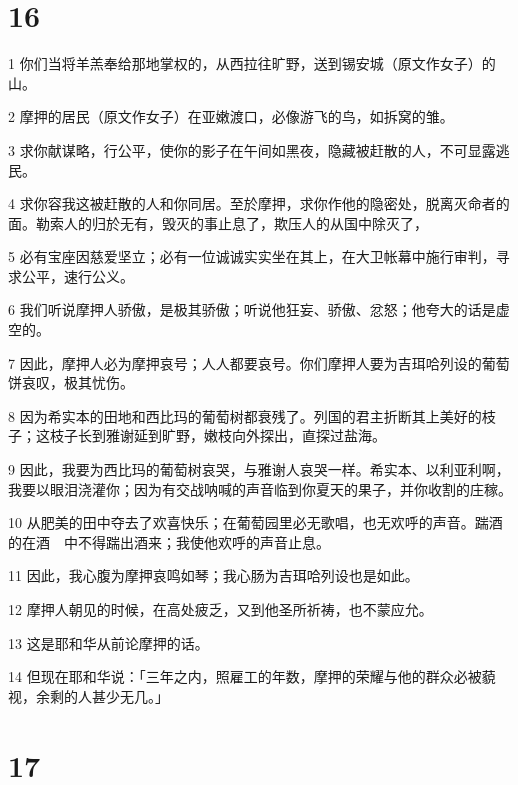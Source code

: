 \chapter{16}

\par 1 你们当将羊羔奉给那地掌权的，从西拉往旷野，送到锡安城（原文作女子）的山。
\par 2 摩押的居民（原文作女子）在亚嫩渡口，必像游飞的鸟，如拆窝的雏。
\par 3 求你献谋略，行公平，使你的影子在午间如黑夜，隐藏被赶散的人，不可显露逃民。
\par 4 求你容我这被赶散的人和你同居。至於摩押，求你作他的隐密处，脱离灭命者的面。勒索人的归於无有，毁灭的事止息了，欺压人的从国中除灭了，
\par 5 必有宝座因慈爱坚立；必有一位诚诚实实坐在其上，在大卫帐幕中施行审判，寻求公平，速行公义。
\par 6 我们听说摩押人骄傲，是极其骄傲；听说他狂妄、骄傲、忿怒；他夸大的话是虚空的。
\par 7 因此，摩押人必为摩押哀号；人人都要哀号。你们摩押人要为吉珥哈列设的葡萄饼哀叹，极其忧伤。
\par 8 因为希实本的田地和西比玛的葡萄树都衰残了。列国的君主折断其上美好的枝子；这枝子长到雅谢延到旷野，嫩枝向外探出，直探过盐海。
\par 9 因此，我要为西比玛的葡萄树哀哭，与雅谢人哀哭一样。希实本、以利亚利啊，我要以眼泪浇灌你；因为有交战呐喊的声音临到你夏天的果子，并你收割的庄稼。
\par 10 从肥美的田中夺去了欢喜快乐；在葡萄园里必无歌唱，也无欢呼的声音。踹酒的在酒　中不得踹出酒来；我使他欢呼的声音止息。
\par 11 因此，我心腹为摩押哀鸣如琴；我心肠为吉珥哈列设也是如此。
\par 12 摩押人朝见的时候，在高处疲乏，又到他圣所祈祷，也不蒙应允。
\par 13 这是耶和华从前论摩押的话。
\par 14 但现在耶和华说：「三年之内，照雇工的年数，摩押的荣耀与他的群众必被藐视，余剩的人甚少无几。」

\chapter{17}

